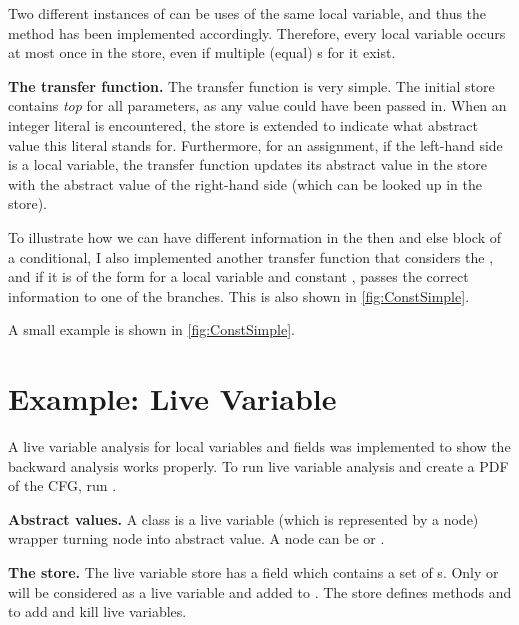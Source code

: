 Two different instances of  can be uses of the
same local variable, and thus the  method has been
implemented accordingly. Therefore, every local variable occurs at
most once in the store, even if multiple (equal)
s for it exist.

\textbf{The transfer function.} The transfer function is very
simple. The initial store contains \emph{top} for all parameters, as
any value could have been passed in.  When an integer literal is
encountered, the store is extended to indicate what abstract value
this literal stands for. Furthermore, for an assignment, if the
left-hand side is a local variable, the transfer function updates its
abstract value in the store with the abstract value of the right-hand
side (which can be looked up in the store).

To illustrate how we can have different information in the then and
else block of a conditional, I also implemented another transfer
function that considers the , and if it is of the
form  for a local variable  and constant
, passes the correct information to one of the branches. This
is also shown in \autoref{fig:ConstSimple}.

 A small example is shown in \autoref{fig:ConstSimple}.



\section{Example: Live Variable}
\label{sec:live_variable}

A live variable analysis for local variables and fields was implemented
to show the backward analysis works properly.
To run live variable analysis and create a PDF of the CFG, run
.

\textbf{Abstract values.} A class  is a live
variable (which is represented by a node) wrapper turning node into
abstract value. A node can be  or .

\textbf{The store.} The live variable store  has a field
 which contains a set of s. Only
 or  will be considered as a
live variable and added to . The store defines methods
 and  to add
and kill live variables.

